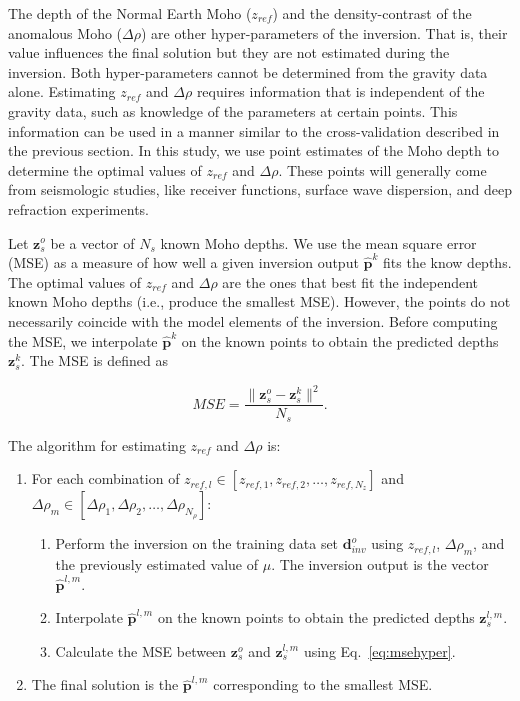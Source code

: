 \documentclass[extra]{gji}
\begin{document}
The depth of the Normal Earth Moho ($z_{ref}$)
and the density-contrast of the anomalous Moho ($\Delta\rho$)
are other hyper-parameters of the inversion.
That is, their value influences the final solution
but they are not estimated during the inversion.
Both hyper-parameters cannot be determined from the gravity data alone.
Estimating $z_{ref}$ and $\Delta\rho$ requires
information that is independent of the gravity data,
such as knowledge of the parameters at certain points.
This information can be used in a manner similar to
the cross-validation described in the previous section.
In this study, we use point estimates of the Moho depth
to determine the optimal values of $z_{ref}$ and $\Delta\rho$.
These points will generally come from seismologic studies,
like receiver functions, surface wave dispersion, and deep refraction
experiments.

Let $\mathbf{z}_s^o$ be a vector of $N_s$ known Moho depths.
We use the mean square error (MSE)
as a measure of how well a given inversion output $\mathbf{\hat{p}}^k$
fits the know depths.
The optimal values of $z_{ref}$ and $\Delta\rho$
are the ones that best fit the independent known Moho depths
(i.e., produce the smallest MSE).
However, the points do not necessarily coincide
with the model elements of the inversion.
Before computing the MSE,
we interpolate $\mathbf{\hat{p}}^k$ on the known points
to obtain the predicted depths $\mathbf{z}_s^k$.
The MSE is defined as

\begin{equation}
    MSE = \dfrac{\|\mathbf{z}^o_s - \mathbf{z}^k_{s}\|^2}{N_s}.
    \label{eq:msehyper}
\end{equation}

The algorithm for estimating $z_{ref}$ and $\Delta\rho$ is:

\begin{enumerate}
    \item For each combination of
        $z_{ref,l} \in [z_{ref,1},z_{ref,2},\ldots,z_{ref,N_z}]$ and
        $\Delta\rho_m \in
         [\Delta\rho_1,\Delta\rho_2,\ldots,\Delta\rho_{N_{\rho}}]$:
    \begin{enumerate}
        \item Perform the inversion on the training data set
            $\mathbf{d}^o_{inv}$ using $z_{ref,l}$, $\Delta\rho_m$, and
            the previously estimated value of $\mu$.
            The inversion output is the vector $\mathbf{\hat{p}}^{l,m}$.
        \item Interpolate $\mathbf{\hat{p}}^{l,m}$
            on the known points to obtain the predicted depths
            $\mathbf{z}_s^{l,m}$.
        \item Calculate the MSE between $\mathbf{z}_s^o$ and
            $\mathbf{z}_s^{l,m}$ using Eq.~\ref{eq:msehyper}.
    \end{enumerate}
    \item The final solution is the $\mathbf{\hat{p}}^{l,m}$ corresponding to
        the smallest MSE.
\end{enumerate}
\end{document}
